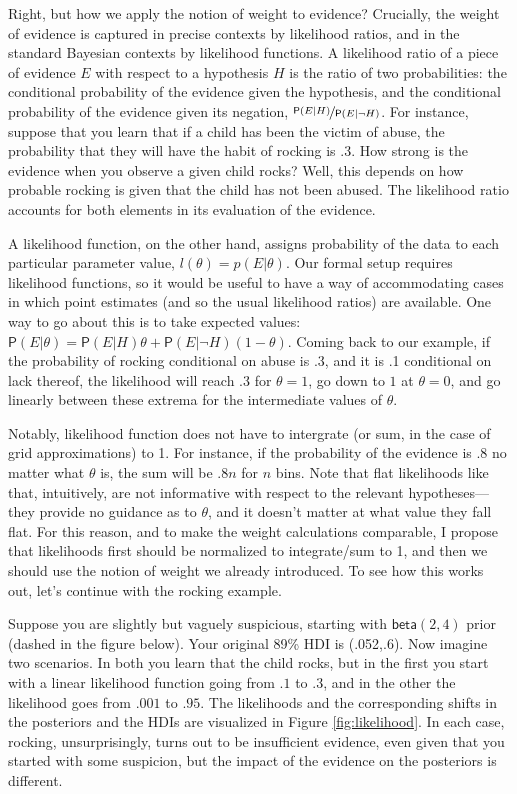 \documentclass[
  10pt,
  dvipsnames,enabledeprecatedfontcommands]{scrartcl}
\newcommand{\n}{\neg}
\newcommand{\pr}[1]{\mathsf{P}(#1)}
\begin{document}
Right, but how we apply the notion of weight to evidence? Crucially, the
weight of evidence is captured in precise contexts by likelihood ratios,
and in the standard Bayesian contexts by likelihood functions. A
likelihood ratio of a piece of evidence \(E\) with respect to a
hypothesis \(H\) is the ratio of two probabilities: the conditional
probability of the evidence given the hypothesis, and the conditional
probability of the evidence given its negation,
\(\nicefrac{\pr{E \vert H}}{\pr{E \vert \n H}}\). For instance, suppose
that you learn that if a child has been the victim of abuse, the
probability that they will have the habit of rocking is .3. How strong
is the evidence when you observe a given child rocks? Well, this depends
on how probable rocking is given that the child has not been abused. The
likelihood ratio accounts for both elements in its evaluation of the
evidence.

A likelihood function, on the other hand, assigns probability of the
data to each particular parameter value,
\(l(\theta) = p(E\vert \theta)\). Our formal setup requires likelihood
functions, so it would be useful to have a way of accommodating cases in
which point estimates (and so the usual likelihood ratios) are
available. One way to go about this is to take expected values:
\(\pr{E\vert \theta} = \pr{E \vert H} \theta + \pr{E \vert \n H}(1- \theta)\).
Coming back to our example, if the probability of rocking conditional on
abuse is .3, and it is .1 conditional on lack thereof, the likelihood
will reach .3 for \(\theta =1\), go down to \(1\) at \(\theta = 0\), and
go linearly between these extrema for the intermediate values of
\(\theta\).

Notably, likelihood function does not have to intergrate (or sum, in the
case of grid approximations) to 1. For instance, if the probability of
the evidence is .8 no matter what \(\theta\) is, the sum will be \(.8n\)
for \(n\) bins. Note that flat likelihoods like that, intuitively, are
not informative with respect to the relevant hypotheses---they provide
no guidance as to \(\theta\), and it doesn't matter at what value they
fall flat. For this reason, and to make the weight calculations
comparable, I propose that likelihoods first should be normalized to
integrate/sum to 1, and then we should use the notion of weight we
already introduced. To see how this works out, let's continue with the
rocking example.

Suppose you are slightly but vaguely suspicious, starting with
\(\mathsf{beta}(2,4)\) prior (dashed in the figure below). Your original
89\% HDI is (.052,.6). Now imagine two scenarios. In both you learn that
the child rocks, but in the first you start with a linear likelihood
function going from \(.1\) to \(.3\), and in the other the likelihood
goes from \(.001\) to \(.95\). The likelihoods and the corresponding
shifts in the posteriors and the HDIs are visualized in Figure
\ref{fig:likelihood}. In each case, rocking, unsurprisingly, turns out
to be insufficient evidence, even given that you started with some
suspicion, but the impact of the evidence on the posteriors is
different.
\end{document}
